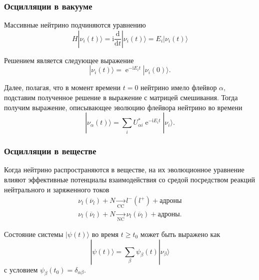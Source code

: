\documentclass[utf8,9pt,mathserif,usepdftitle=false]{beamer}
\newcommand{\dd}{\mathrm{d}}
\renewcommand{\exp}{\operatorname{e}}
\renewcommand{\imath}{\mathrm{i}}
\begin{document}
\begin{frame}
  \frametitle{Осцилляции в вакууме}%
  Массивные нейтрино подчиняются уравнению
	\begin{equation}
		H|\nu_{i}(t)\rangle=\imath\frac{\dd}{\dd t}|\nu_{i}(t)\rangle=
		E_{i}|\nu_{i}(t)\rangle 
	\end{equation}

	Решением является следующее выражение
	\begin{equation}
		|\nu_{i}(t)\rangle=\exp^{-\imath E_{i}t}|\nu_{i}(0)\rangle.
	\end{equation}

	Далее, полагая, что в момент времени \(t=0\) нейтрино имело флейвор
  \(\alpha\), подставим полученное решение в выражение с матрицей
  смешивания. Тогда получим выражение, описывающее эволюцию флейвора нейтрино во
  времени
	\begin{equation}
		|\nu_{\alpha}(t)\rangle=\sum_{i}U_{\alpha i}^{*}\exp^{-\imath E_{i}t}|\nu_{i}\rangle. 
	\end{equation}
\end{frame}

\begin{frame}
	\frametitle{Осцилляции в веществе}%
	Когда нейтрино распространяются в веществе, на их эволюционное уравнение
  влияют эффективные потенциалы взаимодействия со средой посредством реакций
  нейтрального и заряженного токов
    \begin{align*}
  	\nu_{l}(\overline{\nu}_{l})+N\xrightarrow[\text{CC}]{}l^{-}(l^{+})+\text{адроны}\\[2ex]
  	\nu_{l}(\overline{\nu}_{l})+N\xrightarrow[\text{NC}]{}\nu_{l}(\overline{\nu}_{l})+\text{адроны}.
  \end{align*}

  Состояние системы \(|\psi(t)\rangle\) во время \(t \geqslant t_{0}\) может быть выражено как
  \begin{equation}
  	|\psi(t)\rangle=\sum_{\beta}\psi_{\beta}(t)|\nu_{\beta}\rangle
  \end{equation}
  с условием \(\psi_{\beta}(t_{0})=\delta_{\alpha \beta}\).
\end{frame}
\end{document}
